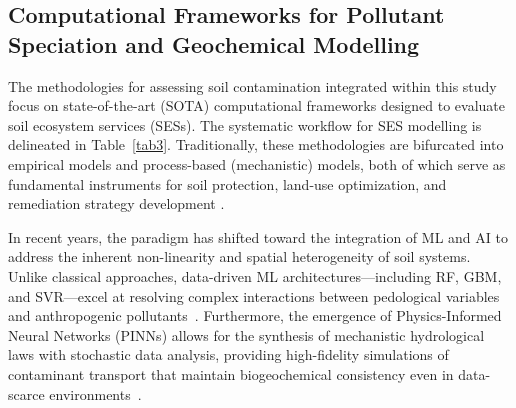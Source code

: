\documentclass[environremediat,article,accept,pdftex,oneauthor]{Definitions/mdpi}
\begin{document}
\subsection{Computational Frameworks for Pollutant Speciation and
    Geochemical Modelling}\label{sec3.3}

The methodologies for assessing soil contamination integrated within this
study focus on state-of-the-art (SOTA) computational frameworks designed to
evaluate soil ecosystem services (SESs). The systematic workflow for SES
modelling is delineated in Table~\ref{tab3}. Traditionally, these
methodologies are bifurcated into empirical models and process-based
(mechanistic) models, both of which serve as fundamental instruments for soil
protection, land-use optimization, and remediation strategy development
\cite{TeranGomez2025,ElSorogy2025,Sandu2025}.

In recent years, the paradigm has shifted toward the integration of ML and AI
to address the inherent non-linearity and spatial heterogeneity of soil
systems. Unlike classical approaches, data-driven ML architectures---including
RF, GBM, and SVR---excel at resolving complex interactions between pedological
variables and anthropogenic pollutants~\cite{Li2025a,Racic2025}. Furthermore,
the emergence of Physics-Informed Neural Networks (PINNs) allows for the
synthesis of mechanistic hydrological laws with stochastic data analysis,
providing high-fidelity simulations of contaminant transport that maintain
biogeochemical consistency even in data-scarce environments~\cite{Haruzi}.
\end{document}
